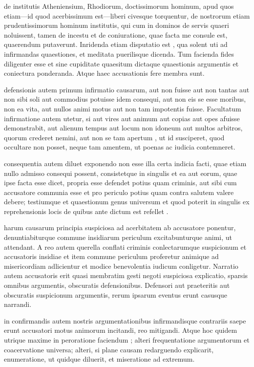  de institutis Atheniensium, Rhodiorum, doctissimorum hominum, apud quos etiam—id quod acerbissimum est—liberi civesque torquentur, de nostrorum etiam prudentissimorum hominum institutis, qui cum in dominos de servis quaeri noluissent, tamen de incestu et de coniuratione, quae facta me consule est, quaerendum putaverunt. Inridenda etiam disputatio est , qua solent uti ad infirmandas quaestiones, et meditata puerilisque dicenda. Tum facienda fides diligenter esse et sine cupiditate quaesitum dictaque quaestionis argumentis et coniectura ponderanda. Atque haec accusationis fere membra sunt.

 defensionis autem primum infirmatio causarum, aut non fuisse aut non tantas aut non sibi soli aut commodius potuisse idem consequi, aut non eis se esse moribus, non ea vita, aut nullos animi motus aut non tam impotentis fuisse. Facultatum infirmatione autem utetur, si aut vires aut animum aut copias aut opes afuisse demonstrabit, aut alienum tempus aut locum non idoneum aut multos arbitros, quorum crederet nemini, aut non se tam apertum , ut id susciperet, quod occultare non posset, neque tam amentem, ut poenas ac iudicia contemneret.

 consequentia autem diluet exponendo non esse illa certa indicia facti, quae etiam nullo admisso consequi possent, consistetque in singulis et ea aut eorum, quae ipse facta esse dicet, propria esse defendet potius quam criminis, aut sibi cum accusatore communia esse et pro periculo potius quam contra salutem valere debere; testiumque et quaestionum genus universum et quod poterit in singulis ex reprehensionis locis de quibus ante dictum est refellet .

 harum causarum principia suspiciosa ad acerbitatem ab accusatore ponentur, denuntiabiturque commune insidiarum periculum excitabunturque animi, ut attendant. A reo autem querella conflati criminis conlectarumque suspicionum et accusatoris insidiae et item commune periculum proferetur animique ad misericordiam adlicientur et modice benevolentia iudicum conligetur. Narratio autem accusatoris erit quasi membratim gesti negoti suspiciosa explicatio, sparsis omnibus argumentis, obscuratis defensionibus. Defensori aut praeteritis aut obscuratis suspicionum argumentis, rerum ipsarum eventus erunt casusque narrandi.

 in confirmandis autem nostris argumentationibus infirmandisque contrariis saepe erunt accusatori motus animorum incitandi, reo mitigandi. Atque hoc quidem utrique maxime in peroratione faciendum ; alteri frequentatione argumentorum et coacervatione universa; alteri, si plane causam redarguendo explicarit, enumeratione, ut quidque diluerit, et miseratione ad extremum.

